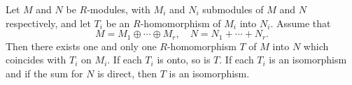 Let $M$ and $N$ be $R$-modules, with $M_i$ and $N_i$ submodules of $M$ and $N$ respectively, and let $T_i$ be an $R$-homomorphism of $M_i$ into $N_i$. Assume that
$$M = M_1 \oplus \cdots \oplus M_r, \quad N = N_1 + \cdots + N_r.$$
Then there exists one and only one $R$-homomorphism $T$ of $M$ into $N$ which coincides with $T_i$ on $M_i$. If each $T_i$ is onto, so is $T$. If each $T_i$ is an isomorphism and if the sum for $N$ is direct, then $T$ is an isomorphism.
